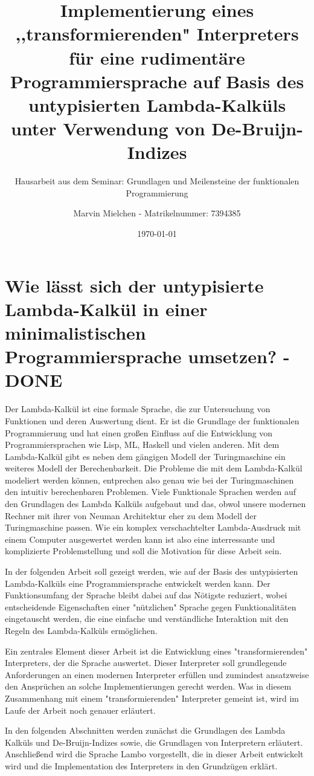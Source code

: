 \documentclass[ngerman]{article}
\title{Implementierung eines ,,transformierenden" Interpreters für eine rudimentäre Programmiersprache auf Basis des untypisierten Lambda-Kalküls unter Verwendung von De-Bruijn-Indizes}
\author{Marvin Mielchen - Matrikelnummer: 7394385}
\subtitle{Hausarbeit aus dem Seminar: Grundlagen und Meilensteine der funktionalen Programmierung}
\date{\today}
\begin{document}
\maketitle


\section{Wie lässt sich der untypisierte Lambda-Kalkül in einer minimalistischen Programmiersprache umsetzen? - DONE}

Der Lambda-Kalkül ist eine formale Sprache, die zur Untersuchung von Funktionen und deren Auswertung dient. Er ist die Grundlage der funktionalen Programmierung und hat einen großen Einfluss auf die Entwicklung von Programmiersprachen wie Lisp, ML, Haskell und vielen anderen.
Mit dem Lambda-Kalkül gibt es neben dem gängigen Modell der Turingmaschine ein weiteres Modell der Berechenbarkeit. 
Die Probleme die mit dem Lambda-Kalkül modeliert werden können, entprechen also genau wie bei der Turingmaschinen den intuitiv berechenbaren Problemen.
Viele Funktionale Sprachen werden auf den Grundlagen des Lambda Kalküls aufgebaut und das, obwol unsere modernen Rechner mit ihrer von Neuman Architektur eher zu dem Modell der Turingmaschine passen.
Wie ein komplex verschachtelter Lambda-Ausdruck mit einem Computer ausgewertet werden kann ist also eine interressante und komplizierte Problemstellung und soll die Motivation für diese Arbeit sein.

In der folgenden Arbeit soll gezeigt werden, wie auf der Basis des untypisierten Lambda-Kalküls eine Programmiersprache entwickelt werden kann. Der Funktionsumfang der Sprache bleibt dabei auf das Nötigste reduziert, wobei entscheidende Eigenschaften einer "nützlichen" Sprache gegen Funktionalitäten eingetauscht werden, die eine einfache und verständliche Interaktion mit den Regeln des Lambda-Kalküls ermöglichen.

Ein zentrales Element dieser Arbeit ist die Entwicklung eines "transformierenden" Interpreters, der die Sprache auswertet. Dieser Interpreter soll grundlegende Anforderungen an einen modernen Interpreter erfüllen und zumindest ansatzweise den Ansprüchen an solche Implementierungen gerecht werden.
Was in diesem Zusammenhang mit einem "transformierenden" Interpreter gemeint ist, wird im Laufe der Arbeit noch genauer erläutert.

In den folgenden Abschnitten werden zunächst die Grundlagen des Lambda Kalküls und De-Bruijn-Indizes sowie, die Grundlagen von Interpretern erläutert. Anschließend wird die Sprache Lambo vorgestellt, die in dieser Arbeit entwickelt wird und die Implementation des Interpreters in den Grundzügen erklärt.
\end{document}
